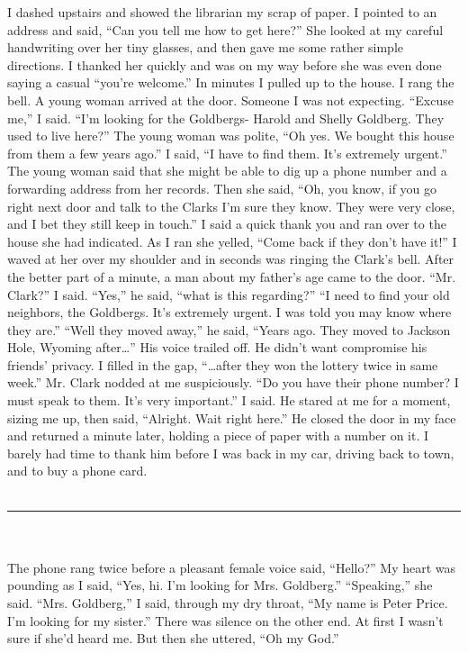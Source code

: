 \documentclass[a4paper]{article}
\begin{document}
I dashed upstairs and showed the librarian my scrap of paper. I pointed to an address and said, “Can you tell me how to get here?”
She looked at my careful handwriting over her tiny glasses, and then gave me some rather simple directions. I thanked her quickly and was on my way before she was even done saying a casual “you’re welcome.”
In minutes I pulled up to the house.
I rang the bell. A young woman arrived at the door. Someone I was not expecting. “Excuse me,” I said. “I’m looking for the Goldbergs- Harold and Shelly Goldberg. They used to live here?”
The young woman was polite, “Oh yes. We bought this house from them a few years ago.”
I said, “I have to find them. It’s extremely urgent.”
The young woman said that she might be able to dig up a phone number and a forwarding address from her records. Then she said, “Oh, you know, if you go right next door and talk to the Clarks I’m sure they know. They were very close, and I bet they still keep in touch.”
I said a quick thank you and ran over to the house she had indicated. As I ran she yelled, “Come back if they don’t have it!”
I waved at her over my shoulder and in seconds was ringing the Clark’s bell.
After the better part of a minute, a man about my father’s age came to the door. “Mr. Clark?” I said.
“Yes,” he said, “what is this regarding?”
“I need to find your old neighbors, the Goldbergs. It’s extremely urgent. I was told you may know where they are.”
“Well they moved away,” he said, “Years ago. They moved to Jackson Hole, Wyoming after…”
His voice trailed off. He didn’t want compromise his friends’ privacy. I filled in the gap, “…after they won the lottery twice in same week.”
Mr. Clark nodded at me suspiciously.
“Do you have their phone number? I must speak to them. It’s very important.” I said.
He stared at me for a moment, sizing me up, then said, “Alright. Wait right here.”
He closed the door in my face and returned a minute later, holding a piece of paper with a number on it. I barely had time to thank him before I was back in my car, driving back to town, and to buy a phone card. \\ \\

\hrule ~ \\ \\

The phone rang twice before a pleasant female voice said, “Hello?”
My heart was pounding as I said, “Yes, hi. I’m looking for Mrs. Goldberg.”
“Speaking,” she said.
“Mrs. Goldberg,” I said, through my dry throat, “My name is Peter Price. I’m looking for my sister.”
There was silence on the other end. At first I wasn’t sure if she’d heard me. But then she uttered, “Oh my God.”
\end{document}
